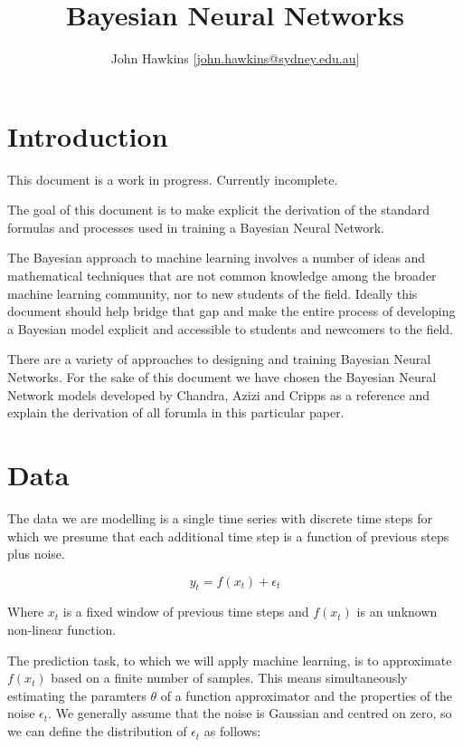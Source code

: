 \documentclass[12pt,a4paper]{article}
\numberwithin{equation}{section}
\begin{document}
\title{Bayesian Neural Networks}

\author{John Hawkins [\href{mailto:john.hawkins@sydney.edu.au}{john.hawkins@sydney.edu.au}] }

\maketitle

\section{Introduction} 

This document is a work in progress. Currently incomplete.

The goal of this document is to make explicit the derivation of the standard formulas 
and processes used in training a Bayesian Neural Network. 

The Bayesian approach to machine learning involves a number of ideas and mathematical techniques
that are not common knowledge among the broader machine learning community, nor to new students
of the field. Ideally this document should help bridge that gap and make the entire process 
of developing a Bayesian model explicit and accessible to students and newcomers to the field.

There are a variety of approaches to designing and training Bayesian Neural Networks. For the 
sake of this document we have chosen the Bayesian Neural Network models developed by 
Chandra, Azizi and Cripps \cite{Chandra+Azizi+Cripps:2017} as a reference and explain the
derivation of all forumla in this particular paper.

\section{Data}

The data we are modelling is a single time series with discrete time steps
for which we presume that each additional time step is a function of previous 
steps plus noise.

\begin{equation}
y_t = f(x_t) + \epsilon_t
\end{equation}

Where $x_t$ is a fixed window of previous time steps and $f(x_t)$ is an unknown
non-linear function.

The prediction task, to which we will apply machine learning, is to approximate 
$f(x_t)$ based on a finite number of samples. This means simultaneously estimating 
the paramters $\theta$ of a function approximator and the properties of the noise $\epsilon_t$.
We generally assume that the noise is Gaussian and centred on zero, so we can define
the distribution of $\epsilon_t$ as follows:
\end{document}
